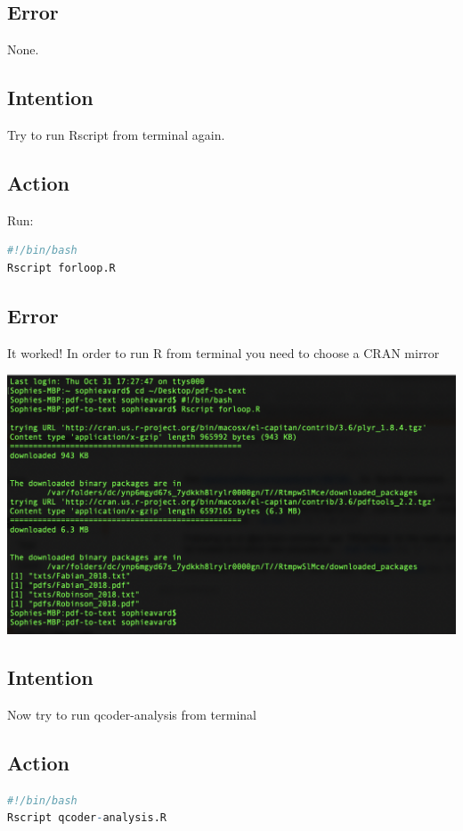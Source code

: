 \documentclass{article}
\begin{document}
\subsection{Error}
None.

\subsection{Intention}
Try to run Rscript from terminal again.

\subsection{Action}
Run: 
\begin{lstlisting}[language=R]
#!/bin/bash
Rscript forloop.R
\end{lstlisting}

\subsection{Error}
It worked! In order to run R from terminal you need to choose a CRAN mirror

\includegraphics[width=\textwidth]{forloop-terminal-command.png}

\subsection{Intention}
Now try to run qcoder-analysis from terminal 

\subsection{Action}
\begin{lstlisting}[language=R]
#!/bin/bash
Rscript qcoder-analysis.R
\end{lstlisting}
\end{document}
